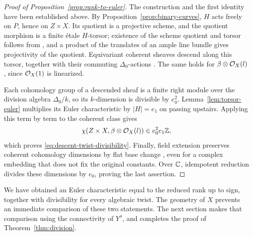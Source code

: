 \begin{proof}[Proof of Proposition~\ref{prop:rank-to-euler}]
The construction and the first identity have been established
above.  By Proposition~\ref{prop:binary-curves}, \(H\) acts freely
on \(P\), hence on \(Z\times X\).  Its quotient is a projective
scheme, and the quotient morphism is a finite étale \(H\)-torsor;
existence of the scheme quotient and torsor follows from
\cite[Tag 07S7]{Stacks}, and a product of the translates of an
ample line bundle gives projectivity of the quotient.
Equivariant coherent sheaves descend along this torsor, together
with their commuting \(\Delta_0\)-actions
\cite[Proposition~35.5.2, Tag 023R]{Stacks}. The same holds for
\(\beta\otimes\mathcal O_X(l)\), since \(\mathcal O_X(1)\) is linearized.

Each cohomology group of a descended sheaf is a finite right
module over the division algebra \(\Delta_0/k\), so its
\(k\)-dimension is divisible by \(e_0^2\).
Lemma~\ref{lem:torsor-euler} multiplies its Euler characteristic
by \(|H|=e_1\) on passing upstairs.  Applying this term by term
to the coherent class gives
\[
\chi(Z\times X,\beta\otimes\mathcal O_X(l))\in e_0^2e_1\mathbb Z,
\]
which proves \eqref{eq:descent-twist-divisibility}.
Finally, field extension preserves coherent cohomology dimensions
by flat base change \cite[Tag 02KH]{Stacks}, even for a complex
embedding that does not fix the original constants.  Over \(\mathbb C\),
idempotent reduction divides these dimensions by \(e_0\), proving
the last assertion.
\end{proof}

We have obtained an Euler characteristic equal to the reduced
rank up to sign, together with divisibility for every algebraic
twist.  The geometry of \(X\) prevents an immediate comparison of
these two statements.  The next section makes that comparison
using the connectivity of \(Y^o\), and completes the proof of
Theorem~\ref{thm:division}.
